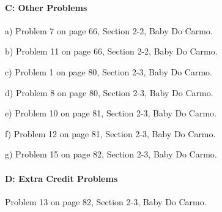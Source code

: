 \documentclass[12pt]{article}
\begin{document}
\paragraph{C: Other Problems}
\begin{itemize}
	{\item a) Problem 7 on page 66, Section 2-2, Baby Do Carmo.}
	{\item b) Problem 11 on page 66, Section 2-2, Baby Do Carmo.}
	{\item c) Problem 1 on page 80, Section 2-3, Baby Do Carmo.}
	{\item d) Problem 8 on page 80, Section 2-3, Baby Do Carmo.}
	{\item e) Problem 10 on page 81, Section 2-3, Baby Do Carmo.}
	{\item f) Problem 12 on page 81, Section 2-3, Baby Do Carmo.}
	{\item g) Problem 15 on page 82, Section 2-3, Baby Do Carmo.}
\end{itemize}

\paragraph{D: Extra Credit Problems}
\begin{itemize}
	{\item Problem 13 on page 82, Section 2-3, Baby Do Carmo.}
\end{itemize}
\end{document}
